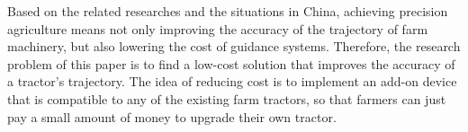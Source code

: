 Based on the related researches and the situations in China, achieving precision agriculture means not only improving the accuracy of the trajectory of farm machinery, but also lowering the cost of guidance systems. Therefore, the research problem of this paper is to find a low-cost solution that improves the accuracy of a tractor's trajectory. The idea of reducing cost is to implement an add-on device that is compatible to any of the existing farm tractors, so that farmers can just pay a small amount of money to upgrade their own tractor. 

